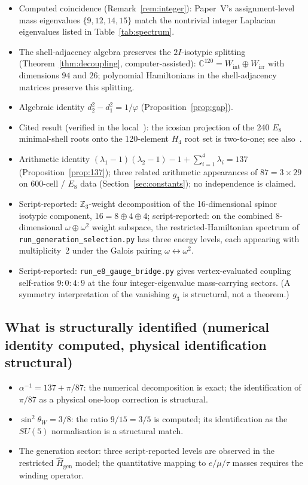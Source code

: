 \documentclass[12pt]{article}
\begin{document}
\begin{itemize}
    \item Computed coincidence (Remark~\ref{rem:integer}): Paper~V's assignment-level mass eigenvalues $\{9, 12, 14, 15\}$ match the nontrivial integer Laplacian eigenvalues listed in Table~\ref{tab:spectrum}.
    \item The shell-adjacency algebra preserves the $2I$-isotypic splitting (Theorem~\ref{thm:decoupling}, computer-assisted): $\mathbb{C}^{120} = W_{\mathrm{int}} \oplus W_{\mathrm{irr}}$ with dimensions $94$ and $26$; polynomial Hamiltonians in the shell-adjacency matrices preserve this splitting.
    \item Algebraic identity $d_2^2 - d_1^2 = 1/\varphi$ (Proposition~\ref{prop:gap}).
    \item Cited result (verified in the local~\citealp{CascadeAlgSubstrate}): the icosian projection of the 240 $E_8$ minimal-shell roots onto the 120-element $H_4$ root set is two-to-one; see also~\citet{Koca2007, MoodyPatera1993}.
    \item Arithmetic identity $(\lambda_1 - 1)(\lambda_2 - 1) - 1 + \sum_{i=1}^4 \lambda_i = 137$ (Proposition~\ref{prop:137}); three related arithmetic appearances of $87 = 3 \times 29$ on 600-cell / $E_8$ data (Section~\ref{sec:constants}); no independence is claimed.
    \item Script-reported: $\mathbb{Z}_3$-weight decomposition of the 16-dimensional spinor isotypic component, $16 = 8 \oplus 4 \oplus 4$; script-reported: on the combined 8-dimensional $\omega \oplus \omega^2$ weight subspace, the restricted-Hamiltonian spectrum of \texttt{run\_generation\_selection.py} has three energy levels, each appearing with multiplicity~2 under the Galois pairing $\omega \leftrightarrow \omega^2$.
    \item Script-reported: \texttt{run\_e8\_gauge\_bridge.py} gives vertex-evaluated coupling self-ratios $9:0:4:9$ at the four integer-eigenvalue mass-carrying sectors. (A symmetry interpretation of the vanishing $g_3$ is structural, not a theorem.)
\end{itemize}

\subsection{What is structurally identified (numerical identity computed, physical identification structural)}

\begin{itemize}
    \item $\alpha^{-1} = 137 + \pi/87$: the numerical decomposition is exact; the identification of $\pi/87$ as a physical one-loop correction is structural.
    \item $\sin^2\theta_W = 3/8$: the ratio $9/15 = 3/5$ is computed; its identification as the $SU(5)$ normalisation is a structural match.
    \item The generation sector: three script-reported levels are observed in the restricted $\widehat{H}_{\mathrm{gen}}$ model; the quantitative mapping to $e/\mu/\tau$ masses requires the winding operator.
\end{itemize}
\end{document}
